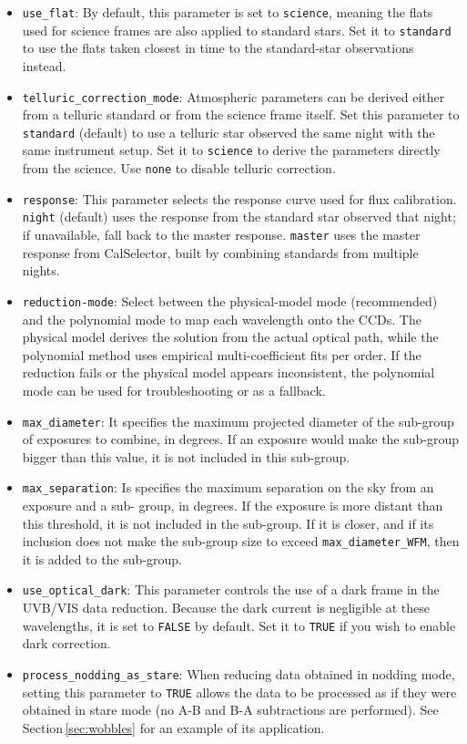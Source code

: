 \begin{itemize}
\item {\tt use\_flat}: 
By default, this parameter is set to {\tt science}, 
meaning the flats used for science frames are also applied to standard stars.
Set it to {\tt standard} to use the flats taken closest in time 
to the standard-star observations instead.

\item {\tt telluric\_correction\_mode}: 
Atmospheric parameters can be derived either from 
a telluric standard or from the science frame itself.
Set this parameter to {\tt standard} (default) to use a telluric star 
observed the same night with the same instrument setup.
Set it to {\tt science} to derive the parameters directly from the science.
Use {\tt none} to disable telluric correction.

\item {\tt response}:
This parameter selects the response curve used for flux calibration.
{\tt night} (default) uses the response from the standard star observed that night; 
if unavailable, fall back to the master response.
{\tt master} uses the master response from CalSelector, 
built by combining standards from multiple nights.

\item {\tt reduction-mode}:
Select between the physical-model mode (recommended) 
and the polynomial mode to map each wavelength onto the CCDs.
The physical model derives the solution from the actual optical path, 
while the polynomial method uses empirical multi-coefficient fits per order.
If the reduction fails or the physical model appears inconsistent, 
the polynomial mode can be used for troubleshooting or as a fallback.

\item {\tt max\_diameter}:
It specifies the maximum projected diameter of the sub-group of exposures to
combine, in degrees. If an exposure would make the sub-group bigger than this value, it is not included
in this sub-group.

\item {\tt max\_separation}:
Is specifies the maximum separation on the sky from an exposure and a sub-
group, in degrees. If the exposure is more distant than this threshold, it is not included in the sub-group.
If it is closer, and if its inclusion does not make the sub-group size to exceed {\tt max\_diameter\_WFM}, then
it is added to the sub-group.

\item {\tt use\_optical\_dark}:
This parameter controls the use of a dark frame in the UVB/VIS data reduction.
Because the dark current is negligible at these wavelengths, 
it is set to {\tt FALSE} by default.
Set it to {\tt TRUE} if you wish to enable dark correction.

\item {\tt process\_nodding\_as\_stare}:
When reducing data obtained in nodding mode, setting this parameter to {\tt TRUE} allows the data to be processed as if they were obtained in stare mode (no A-B and B-A subtractions are performed). See Section\,\ref{sec:wobbles} for an example of its application.
\end{itemize}

